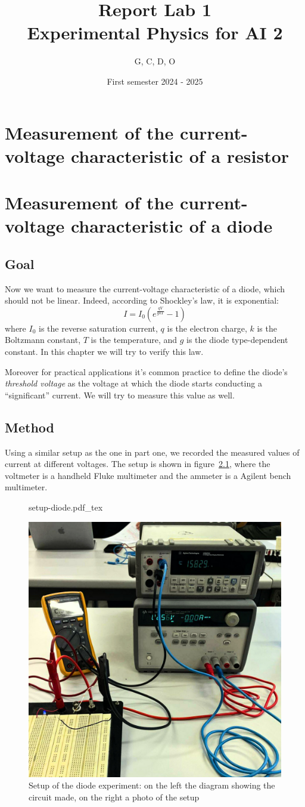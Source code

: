 \documentclass{report}
\title{Report Lab 1\\\small Experimental Physics for AI 2}
\author{G, C, D, O}
\date{First semester 2024 \-- 2025}
\newcommand{\incfig}[2][1]{%
    \def\svgwidth{#1\columnwidth}
    {#2.pdf_tex}
}
\numberwithin{equation}{section}
\theoremstyle{plain}
\theoremstyle{definition}
\theoremstyle{remark}
\begin{document}
\maketitle

\chapter{Measurement of the current-voltage characteristic of a resistor}
\chapter{Measurement of the current-voltage characteristic of a diode}
\section{Goal}
Now we want to measure the current-voltage characteristic of a diode, which
should not be linear. Indeed, according to Shockley's law, it is exponential:
\[
    I = I_0 \left( e^{\frac{qV}{gkT}} - 1 \right)
\]
where $I_0$ is the reverse saturation current, $q$ is the electron charge, \(k\)
is the Boltzmann constant, \(T\) is the temperature, and \(g\) is the diode
type-dependent constant. In this chapter we will try to verify this law.

Moreover for practical applications it's common practice to define the diode's
\emph{threshold voltage} as the voltage at which the diode starts conducting a
``significant'' current. We will try to measure this value as well.

\section{Method}
Using a similar setup as the one in part one, we recorded the measured values of
current at different voltages. The setup is shown in
figure~\ref{fig:setup-diode}, where the voltmeter is a handheld Fluke
multimeter and the ammeter is a Agilent bench multimeter.

\begin{figure}[ht]
    \centering
    \incfig[.45]{setup-diode}
    \includegraphics[width=.45\textwidth]{figures/setup.png}
    \caption{Setup of the diode experiment: on the left the diagram showing
    the circuit made, on the right a photo of the setup}\label{fig:setup-diode}
\end{figure}
\end{document}
